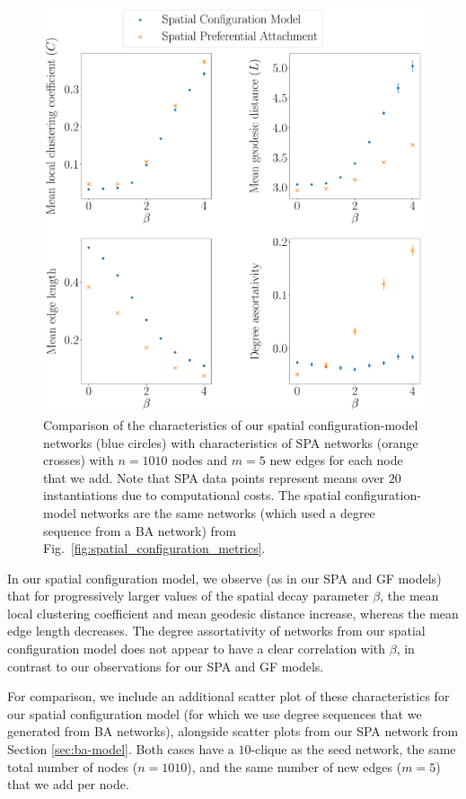\documentclass[%
 reprint,
 amsmath,amssymb,
 aps,
]{revtex4-1}
\begin{document}
\begin{figure}
    \centering
    \includegraphics[width=1.0\linewidth]{spatial_preferential_comparison.pdf}
    \caption{Comparison of the characteristics of our spatial configuration-model networks (blue circles) with characteristics of SPA networks (orange crosses) with $n = 1010$ nodes and $m = 5$ new edges for each node that we add. Note that SPA data points represent means over $20$ instantiations due to computational costs. The spatial configuration-model networks are the same networks (which used a degree sequence from a BA network) from Fig.~\ref{fig:spatial_configuration_metrics}.
}
    \label{fig:spatial_preferential_comparison}
\end{figure}
 
    
In our spatial configuration model, we observe (as in our SPA and GF models) that for progressively larger values of the spatial decay parameter $\beta$, the mean local clustering coefficient and mean geodesic distance increase, whereas the mean edge length decreases. The degree assortativity of networks from our spatial configuration model does not appear to have a clear correlation with $\beta$, in contrast to our observations for our SPA and GF models.

For comparison, we include an additional scatter plot of these characteristics for our spatial configuration model (for which we use degree sequences that we generated from BA networks), alongside scatter plots from our SPA network from Section \ref{sec:ba-model}. Both cases have a $10$-clique as the seed network, the same total number of nodes ($n=1010$), and the same number of new edges ($m=5$) that we add per node.
\end{document}
